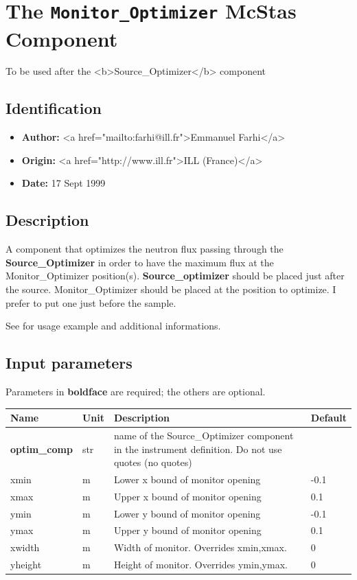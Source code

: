 \section{The \texttt{Monitor\_Optimizer} McStas Component}
To be used after the \textless{}b\textgreater{}Source\_Optimizer\textless{}/b\textgreater{} component

\subsection*{Identification}
\begin{itemize}
  \item \textbf{Author:} \textless{}a href="mailto:farhi@ill.fr"\textgreater{}Emmanuel Farhi\textless{}/a\textgreater{}
  \item \textbf{Origin:} \textless{}a href="http://www.ill.fr"\textgreater{}ILL (France)\textless{}/a\textgreater{}
  \item \textbf{Date:} 17 Sept 1999
\end{itemize}

\subsection*{Description}
A component that optimizes the neutron flux passing through the \textbf{Source\_Optimizer} in order to have the maximum flux at the Monitor\_Optimizer position(s). \textbf{Source\_optimizer} should be placed just after the source. Monitor\_Optimizer should be placed at the position to optimize. I prefer to put one just before the sample.

See  for usage example and additional informations.

\subsection*{Input parameters}
Parameters in \textbf{boldface} are required; the others are optional.

\begin{longtable}{p{}p{}p{}p{}}
\toprule
\textbf{Name} & \textbf{Unit} & \textbf{Description} & \textbf{Default} \\
\midrule
\endhead
\textbf{optim\_comp} & str & name of the Source\_Optimizer component in the instrument definition. Do not use quotes (no quotes) &  \\
xmin & m & Lower x bound of monitor opening & -0.1 \\
xmax & m & Upper x bound of monitor opening & 0.1 \\
ymin & m & Lower y bound of monitor opening & -0.1 \\
ymax & m & Upper y bound of monitor opening & 0.1 \\
xwidth & m & Width of monitor. Overrides xmin,xmax. & 0 \\
yheight & m & Height of monitor. Overrides ymin,ymax. & 0 \\
\bottomrule
\end{longtable}

